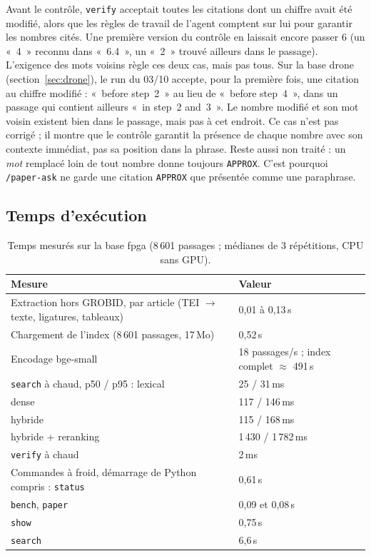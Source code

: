 \documentclass[11pt,a4paper]{article}
\newcommand{\cmd}[1]{\texttt{#1}}
\begin{document}
Avant le contrôle, \cmd{verify} acceptait toutes les citations dont un chiffre avait été
modifié, alors que les règles de travail de l'agent comptent sur lui pour garantir les
nombres cités. Une première version du contrôle en laissait encore passer 6 (un «~4~»
reconnu dans «~6.4~», un «~2~» trouvé ailleurs dans le passage). L'exigence des mots
voisins règle ces deux cas, mais pas tous. Sur la base drone (section~\ref{sec:drone}), le
run du 03/10 accepte, pour la première fois, une citation au chiffre modifié : «~before
step~2~» au lieu de «~before step~4~», dans un passage qui contient ailleurs «~in step~2
and~3~». Le nombre modifié et son mot voisin existent bien dans le passage, mais pas à cet
endroit. Ce cas n'est pas corrigé ; il montre que le contrôle garantit la présence de chaque
nombre avec son contexte immédiat, pas sa position dans la phrase. Reste aussi non traité :
un \emph{mot} remplacé loin de tout nombre donne toujours \cmd{APPROX}. C'est pourquoi
\cmd{/paper-ask} ne garde une citation \cmd{APPROX} que présentée comme une paraphrase.

\subsection{Temps d'exécution}

\begin{table}[ht]
\centering
\caption{Temps mesurés sur la base fpga (8\,601 passages ; médianes de 3 répétitions, CPU sans GPU).}
\label{tab:temps}
\small
\begin{tabularx}{\linewidth}{@{}Ll@{}}
\toprule
Mesure & Valeur \\
\midrule
Extraction hors GROBID, par article (TEI $\rightarrow$ texte, ligatures, tableaux) & 0,01 à 0,13\,s \\
Chargement de l'index (8\,601 passages, 17\,Mo) & 0,52\,s \\
Encodage bge-small & 18 passages/s ; index complet $\approx$ 491\,s \\
\cmd{search} à chaud, p50 / p95 : lexical & 25 / 31\,ms \\
\quad dense & 117 / 146\,ms \\
\quad hybride & 115 / 168\,ms \\
\quad hybride + reranking & 1\,430 / 1\,782\,ms \\
\cmd{verify} à chaud & 2\,ms \\
Commandes à froid, démarrage de Python compris : \cmd{status} & 0,61\,s \\
\quad \cmd{bench}, \cmd{paper} & 0,09 et 0,08\,s \\
\quad \cmd{show} & 0,75\,s \\
\quad \cmd{search} & 6,6\,s \\
\bottomrule
\end{tabularx}
\end{table}
\end{document}

